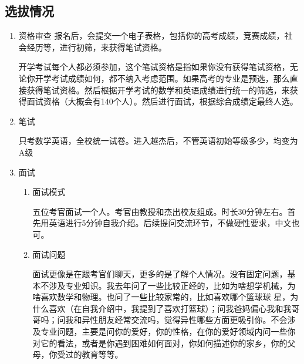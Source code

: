 \documentclass[zihao=-4,fontset=none]{Beautybook-CN}
\begin{document}
\subsection{选拔情况} 
\begin{enumerate}
	\item 资格审查
	      报名后，会提交一个电子表格，包括你的高考成绩，竞赛成绩，社会经历等，进行初筛，来获得笔试资格。
	      \begin{example}
	      	开学考试每个人都必须参加，这个笔试资格是指如果你没有获得笔试资格，无论你开学考试成绩如何，都不纳入考虑范围。如果高考的专业是预选，那么直接获得笔试资格。然后根据开学考试的数学和英语成绩进行统一的筛选，来获得面试资格（大概会有140个人）。然后进行面试，根据综合成绩定最终人选。
	      \end{example}
	\item 笔试
	       
	      只考数学英语，全校统一试卷。进入越杰后，不管英语初始等级多少，均变为A级	      
	\item 面试
	      \begin{enumerate}
	      	\item 面试模式
	      	      	      	      	      	          
	      	      五位考官面试一个人。考官由教授和杰出校友组成。时长30分钟左右。首先用英语进行5分钟自我介绍。后续提问交流环节，不做硬性要求，中文也可。
	      	      	      	      	      	          
	      	\item 面试问题
	      	      	      	      	      	          
	      	      面试更像是在跟考官们聊天，更多的是了解个人情况。没有固定问题，基本不涉及专业知识。我去年问了一些比较正经的，比如为啥想学机械，为啥喜欢数学和物理。也问了一些比较家常的，比如喜欢哪个篮球球 星，为什么喜欢（在自我介绍中，我提到了喜欢打篮球）；问我爸妈偏心我和我哥哥吗；问我和异性朋友经常交流吗，觉得异性哪些方面更吸引你。不会涉及专业问题，主要是问你的爱好，你的性格，在你的爱好领域内问一些你对它的看法，或者是你遇到困难如何面对，你如何描述你的家乡，你的父母，你受过的教育等等。
	      	      	      	      	      	          

\end{enumerate}
\end{enumerate}
\end{document}
